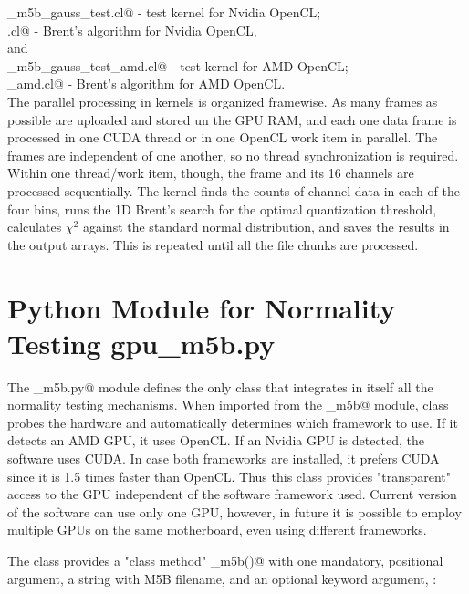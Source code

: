 \documentclass[letterpaper,twoside,12pt]{article}
\newcommand{\midtilde}{\raisebox{0.5ex}{\texttildelow}}
\begin{document}
\noindent \verb@ker_m5b_gauss_test.cl@ - test kernel for Nvidia OpenCL; \\
\noindent \verb@fminbndf.cl@ - Brent's algorithm for Nvidia OpenCL, \\

\noindent and \\

\noindent \verb@ker_m5b_gauss_test_amd.cl@ - test kernel for AMD OpenCL; \\
\noindent \verb@fminbndf_amd.cl@ - Brent's algorithm for AMD OpenCL. \\

The parallel processing in kernels is organized framewise. As many frames as possible are uploaded and stored un the GPU RAM, and each one data frame is processed in one CUDA thread or in one OpenCL work item in parallel. The frames are independent of one another, so no thread synchronization is required. Within one thread/work item, though, the frame and its 16 channels are processed sequentially. The kernel finds the counts of channel data in each of the four bins, runs the 1D Brent's search for the optimal quantization threshold, calculates $\chi^2$ against the standard normal distribution, and saves the results in the output arrays. This is repeated until all the file chunks are processed.





\section{Python Module for Normality Testing gpu\_m5b.py}

The \verb@gpu_m5b.py@ module defines the only class \verb@Normtest@ that integrates in itself all the normality testing mechanisms. When imported from the \verb@gpu_m5b@ module, \verb@Normtest@ class probes the hardware and automatically determines which framework to use. If it detects an AMD GPU, it uses OpenCL. If an Nvidia GPU is detected, the software uses CUDA. In case both frameworks are installed, it prefers CUDA since it is \midtilde 1.5  times faster than OpenCL. Thus this class provides "transparent" access to the GPU independent of the software framework used. Current version of the software can use only one GPU, however, in future it is possible to employ multiple GPUs on the same motherboard, even using different frameworks. 

The \verb@Normtest@ class provides a "class method" \verb@do_m5b()@ with one mandatory, positional argument, a string with M5B filename, and an optional keyword argument, \verb@nthreads@: \\
\end{document}
